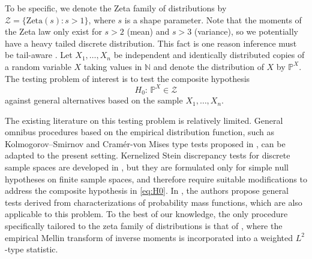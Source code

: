 \documentclass{article}
\theoremstyle{thm}
\theoremstyle{def}
\begin{document}
To be specific, we denote the Zeta family of distributions by $\mathcal{Z}=\{ \mathrm{Zeta}(s): s>1\}$, where $s$ is a shape parameter. Note that the moments of the Zeta law only exist for $s>2$ (mean) and $s>3$ (variance), so we potentially have a heavy tailed discrete distribution. This fact is one reason inference must be tail-aware \citep{JohnsonKotzKemp2005,Newman2005}. Let $X_1,\ldots,X_n$ be independent and identically distributed copies of a random variable $X$ taking values in $\mathbb{N}$ and denote the distribution of $X$ by $\mathbb{P}^X$. The testing problem of interest is to test the composite hypothesis
\begin{equation}\label{eq:H0}
    H_0:\,\mathbb{P}^X\in\mathcal{Z}
\end{equation}
against general alternatives based on the sample $X_1,\ldots,X_n$.

The existing literature on this testing problem is relatively limited. General omnibus procedures based on the empirical distribution function, such as Kolmogorov–Smirnov and Cramér-von Mises type tests proposed in \cite{H:1996}, can be adapted to the present setting. Kernelized Stein discrepancy tests for discrete sample spaces are developed in \cite{Yang:2018}, but they are formulated only for simple null hypotheses on finite sample spaces, and therefore require suitable modifications to address the composite hypothesis in \eqref{eq:H0}. In \cite{BEN:2022}, the authors propose general tests derived from characterizations of probability mass functions, which are also applicable to this problem. To the best of our knowledge, the only procedure specifically tailored to the zeta family of distributions is that of \cite{M:2009}, where the empirical Mellin transform of inverse moments is incorporated into a weighted $L^2$-type statistic.
\end{document}
